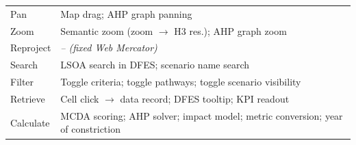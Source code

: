 \begin{table}[htbp]
\begin{tabular}{@{}lp{5.8cm}@{}}
Pan         & Map drag; AHP graph panning \\
Zoom        & Semantic zoom (zoom $\rightarrow$ H3 res.); AHP graph zoom \\
Reproject   & \emph{-- (fixed Web Mercator)} \\
Search      & LSOA search in DFES; scenario name search \\
Filter      & Toggle criteria; toggle pathways; toggle scenario visibility \\
Retrieve    & Cell click $\rightarrow$ data record; DFES tooltip; KPI readout \\
Calculate   & MCDA scoring; AHP solver; impact model; metric conversion; year of constriction \\
\bottomrule
\end{tabular}
\end{table}
